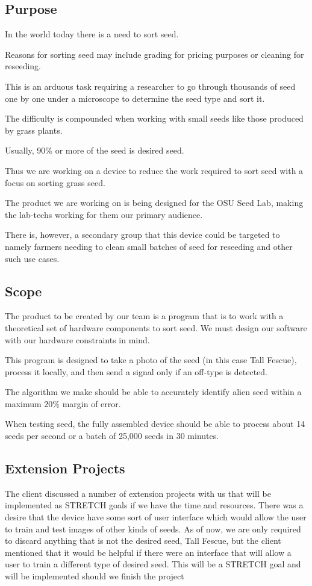 \documentclass[onecolumn, draftclsnofoot,10pt, compsoc]{IEEEtran}
\begin{document}
	\subsection{Purpose}
	
	In the world today there is a need to sort seed.
	
	Reasons for sorting seed may include grading for pricing purposes or cleaning for reseeding. 
	
	This is an arduous task requiring a researcher to go through thousands of seed one by one under a microscope to determine the seed type and sort it.
	
	The difficulty is compounded when working with small seeds like those produced by grass plants.
	
	Usually, 90\% or more of the seed is desired seed.
	
	Thus we are working on a device to reduce the work required to sort seed with a focus on sorting grass seed.
	
	The product we are working on is being designed for the OSU Seed Lab, making the lab-techs working for them our primary audience.
	
	There is, however, a secondary group that this device could be targeted to namely farmers needing to clean small batches of seed for reseeding and other such use cases.
	
	
	
	\subsection{Scope}
	
	The product to be created by our team is a program that is to work with a theoretical set of hardware components to sort seed. We must design our software with our hardware constraints in mind. 
	
	This program is designed to take a photo of the seed (in this case Tall Fescue), process it locally, and then send a signal only if an off-type is detected.
	
	The algorithm we make should be able to accurately identify alien seed within a maximum 20\% margin of error.
	
	When testing seed, the fully assembled device should be able to process about 14 seeds per second or a batch of 25,000 seeds in 30 minutes. 
	
	\subsection{Extension Projects}
	The client discussed a number of extension projects with us that will be implemented as STRETCH goals if we have the time and resources. There was a desire that the device have some sort of user interface which would allow the user to train and test images of other kinds of seeds. As of now, we are only required to discard anything that is not the desired seed, Tall Fescue, but the client mentioned that it would be helpful if there were an interface that will allow a user to train a different type of desired seed. This will be a STRETCH goal and will be implemented should we finish the project
	
\end{document}
